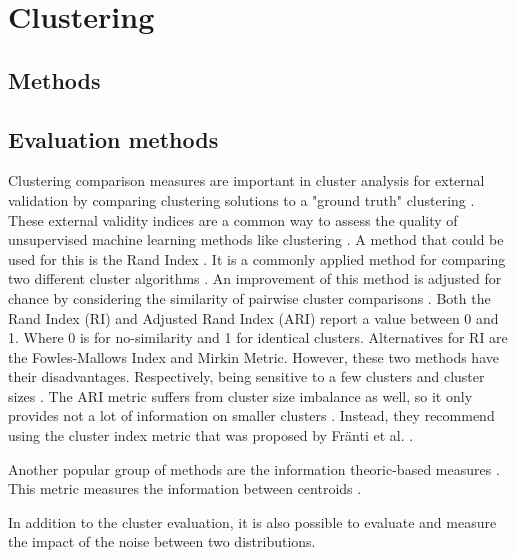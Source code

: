 \section{Clustering}

\subsection{Methods}
\subsection{Evaluation methods} \label{theory:evaluate}
Clustering comparison measures are important in cluster analysis for external validation by comparing clustering solutions to a "ground truth" clustering \citep{vinh_information_nodate-2}.
These external validity indices are a common way to assess the quality of unsupervised machine learning methods like clustering \citep{warrens_understanding_2022}.
A method that could be used for this is the Rand Index \cite{rand_objective_1971}.
It is a commonly applied method for comparing two different cluster algorithms \cite{wagner_comparing_nodate}.
An improvement of this method is adjusted for chance by considering the similarity of pairwise cluster comparisons \cite{vinh_information_nodate-2}.
Both the Rand Index (RI) and Adjusted Rand Index (ARI) \citep{hubert_comparing_1985-1} report a value between 0 and 1.
Where 0 is for no-similarity and 1 for identical clusters.
Alternatives for RI are the Fowles-Mallows Index and Mirkin Metric.
However, these two methods have their disadvantages. Respectively, being sensitive to a few clusters and cluster sizes \citep{wagner_comparing_nodate}.
The ARI metric suffers from cluster size imbalance as well, so it only provides not a lot of information on smaller clusters \citep{warrens_understanding_2022}.
Instead, they recommend using the cluster index metric that was proposed by Fränti et al. \citep{franti_centroid_2014}.

Another popular group of methods are the information theoric-based measures \cite{vinh_information_nodate-2}.
This metric measures the information between centroids \cite{vinh_information_nodate-2}.

In addition to the cluster evaluation, it is also possible to evaluate and measure the impact of the noise between two distributions.

